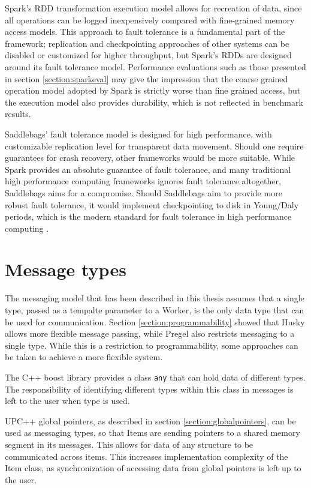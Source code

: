 \documentclass{uit-report}
\begin{document}
Spark's RDD transformation execution model allows for recreation of data, since all operations can be logged inexpensively compared with fine-grained memory access models. This approach to fault tolerance is a fundamental part of the framework; replication and checkpointing approaches of other systems can be disabled or customized for higher throughput, but Spark's RDDs are designed around its fault tolerance model. Performance evaluations such as those presented in section \ref{section:sparkeval} may give the impression that the coarse grained operation model adopted by Spark is strictly worse than fine grained access, but the execution model also provides durability, which is not reflected in benchmark results. 

Saddlebags' fault tolerance model is designed for high performance, with customizable replication level for transparent data movement. Should one require guarantees for crash recovery, other frameworks would be more suitable. While Spark provides an absolute guarantee of fault tolerance, and many traditional high performance computing frameworks ignores fault tolerance altogether, Saddlebags aims for a compromise. Should Saddlebags aim to provide more robust fault tolerance, it would implement checkpointing to disk in Young/Daly periods, which is the modern standard for fault tolerance in high performance computing \cite{herault2016fault}.

\section{Message types}
The messaging model that has been described in this thesis assumes that a single type, passed as a tempalte parameter to a Worker, is the only data type that can be used for communication. Section \ref{section:programmability} showed that Husky allows more flexible message passing, while Pregel also restricts messaging to a single type. While this is a restriction to programmability, some approaches can be taken to achieve a more flexible system. 

The C++ boost library provides a class \texttt{any} \cite{boostany} that can hold data of different types. The responsibility of identifying different types within this class in messages is left to the user when type is used.

UPC++ global pointers, as described in section \ref{section:globalpointers}, can be used as messaging types, so that Items are sending pointers to a shared memory segment in its messages. This allows for data of any structure to be communicated across items. This increases implementation complexity of the Item class, as synchronization of accessing data from global pointers is left up to the user.
\end{document}
